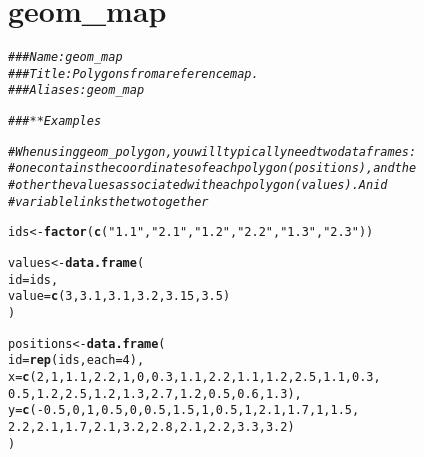 \documentclass[a4paper,titlepage]{tufte-handout}\usepackage[]{graphicx}\usepackage[]{color}
\makeatletter
\newcommand{\hlnum}[1]{\textcolor[rgb]{0.686,0.059,0.569}{#1}}%
\newcommand{\hlstr}[1]{\textcolor[rgb]{0.192,0.494,0.8}{#1}}%
\newcommand{\hlcom}[1]{\textcolor[rgb]{0.678,0.584,0.686}{\textit{#1}}}%
\newcommand{\hlopt}[1]{\textcolor[rgb]{0,0,0}{#1}}%
\newcommand{\hlstd}[1]{\textcolor[rgb]{0.345,0.345,0.345}{#1}}%
\newcommand{\hlkwb}[1]{\textcolor[rgb]{0.69,0.353,0.396}{#1}}%
\newcommand{\hlkwc}[1]{\textcolor[rgb]{0.333,0.667,0.333}{#1}}%
\newcommand{\hlkwd}[1]{\textcolor[rgb]{0.737,0.353,0.396}{\textbf{#1}}}%
\newenvironment{kframe}{%
 \def\at@end@of@kframe{}%
 \ifinner\ifhmode%
  \def\at@end@of@kframe{\end{minipage}}%
  \begin{minipage}{\columnwidth}%
 \fi\fi%
 \def\FrameCommand##1{\hskip\@totalleftmargin \hskip-\fboxsep
 \colorbox{shadecolor}{##1}\hskip-\fboxsep
     \hskip-\linewidth \hskip-\@totalleftmargin \hskip\columnwidth}%
 \MakeFramed {\advance\hsize-\width
   \@totalleftmargin\z@ \linewidth\hsize
   \@setminipage}}%
 {\par\unskip\endMakeFramed%
 \at@end@of@kframe}
\newenvironment{knitrout}{}{} %
\makeatother
\begin{document}
\begin{knitrout}
\begin{kframe}
\begin{alltt}
\end{alltt}
\end{kframe}
\end{knitrout}



\section{geom\_map}

\begin{knitrout}
\color{fgcolor}\begin{kframe}
\begin{alltt}
\hlcom{### Name: geom_map}
\hlcom{### Title: Polygons from a reference map.}
\hlcom{### Aliases: geom_map}

\hlcom{### ** Examples}

\hlcom{# When using geom_polygon, you will typically need two data frames:}
\hlcom{# one contains the coordinates of each polygon (positions),  and the}
\hlcom{# other the values associated with each polygon (values).  An id}
\hlcom{# variable links the two together}

\hlstd{ids} \hlkwb{<-} \hlkwd{factor}\hlstd{(}\hlkwd{c}\hlstd{(}\hlstr{"1.1"}\hlstd{,} \hlstr{"2.1"}\hlstd{,} \hlstr{"1.2"}\hlstd{,} \hlstr{"2.2"}\hlstd{,} \hlstr{"1.3"}\hlstd{,} \hlstr{"2.3"}\hlstd{))}

\hlstd{values} \hlkwb{<-} \hlkwd{data.frame}\hlstd{(}
  \hlkwc{id} \hlstd{= ids,}
  \hlkwc{value} \hlstd{=} \hlkwd{c}\hlstd{(}\hlnum{3}\hlstd{,} \hlnum{3.1}\hlstd{,} \hlnum{3.1}\hlstd{,} \hlnum{3.2}\hlstd{,} \hlnum{3.15}\hlstd{,} \hlnum{3.5}\hlstd{)}
\hlstd{)}

\hlstd{positions} \hlkwb{<-} \hlkwd{data.frame}\hlstd{(}
  \hlkwc{id} \hlstd{=} \hlkwd{rep}\hlstd{(ids,} \hlkwc{each} \hlstd{=} \hlnum{4}\hlstd{),}
  \hlkwc{x} \hlstd{=} \hlkwd{c}\hlstd{(}\hlnum{2}\hlstd{,} \hlnum{1}\hlstd{,} \hlnum{1.1}\hlstd{,} \hlnum{2.2}\hlstd{,} \hlnum{1}\hlstd{,} \hlnum{0}\hlstd{,} \hlnum{0.3}\hlstd{,} \hlnum{1.1}\hlstd{,} \hlnum{2.2}\hlstd{,} \hlnum{1.1}\hlstd{,} \hlnum{1.2}\hlstd{,} \hlnum{2.5}\hlstd{,} \hlnum{1.1}\hlstd{,} \hlnum{0.3}\hlstd{,}
  \hlnum{0.5}\hlstd{,} \hlnum{1.2}\hlstd{,} \hlnum{2.5}\hlstd{,} \hlnum{1.2}\hlstd{,} \hlnum{1.3}\hlstd{,} \hlnum{2.7}\hlstd{,} \hlnum{1.2}\hlstd{,} \hlnum{0.5}\hlstd{,} \hlnum{0.6}\hlstd{,} \hlnum{1.3}\hlstd{),}
  \hlkwc{y} \hlstd{=} \hlkwd{c}\hlstd{(}\hlopt{-}\hlnum{0.5}\hlstd{,} \hlnum{0}\hlstd{,} \hlnum{1}\hlstd{,} \hlnum{0.5}\hlstd{,} \hlnum{0}\hlstd{,} \hlnum{0.5}\hlstd{,} \hlnum{1.5}\hlstd{,} \hlnum{1}\hlstd{,} \hlnum{0.5}\hlstd{,} \hlnum{1}\hlstd{,} \hlnum{2.1}\hlstd{,} \hlnum{1.7}\hlstd{,} \hlnum{1}\hlstd{,} \hlnum{1.5}\hlstd{,}
  \hlnum{2.2}\hlstd{,} \hlnum{2.1}\hlstd{,} \hlnum{1.7}\hlstd{,} \hlnum{2.1}\hlstd{,} \hlnum{3.2}\hlstd{,} \hlnum{2.8}\hlstd{,} \hlnum{2.1}\hlstd{,} \hlnum{2.2}\hlstd{,} \hlnum{3.3}\hlstd{,} \hlnum{3.2}\hlstd{)}
\hlstd{)}


\end{alltt}
\end{kframe}
\end{knitrout}
\end{document}
